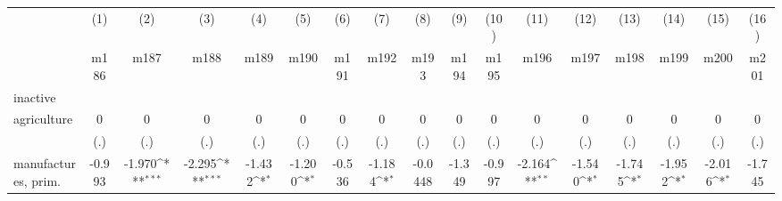 {
\def\sym#1{\ifmmode^{#1}\else\(^{#1}\)\fi}
\begin{tabular}{l*{16}{c}}
\hline\hline
                    &\multicolumn{1}{c}{(1)}&\multicolumn{1}{c}{(2)}&\multicolumn{1}{c}{(3)}&\multicolumn{1}{c}{(4)}&\multicolumn{1}{c}{(5)}&\multicolumn{1}{c}{(6)}&\multicolumn{1}{c}{(7)}&\multicolumn{1}{c}{(8)}&\multicolumn{1}{c}{(9)}&\multicolumn{1}{c}{(10)}&\multicolumn{1}{c}{(11)}&\multicolumn{1}{c}{(12)}&\multicolumn{1}{c}{(13)}&\multicolumn{1}{c}{(14)}&\multicolumn{1}{c}{(15)}&\multicolumn{1}{c}{(16)}\\
                    &\multicolumn{1}{c}{m186}&\multicolumn{1}{c}{m187}&\multicolumn{1}{c}{m188}&\multicolumn{1}{c}{m189}&\multicolumn{1}{c}{m190}&\multicolumn{1}{c}{m191}&\multicolumn{1}{c}{m192}&\multicolumn{1}{c}{m193}&\multicolumn{1}{c}{m194}&\multicolumn{1}{c}{m195}&\multicolumn{1}{c}{m196}&\multicolumn{1}{c}{m197}&\multicolumn{1}{c}{m198}&\multicolumn{1}{c}{m199}&\multicolumn{1}{c}{m200}&\multicolumn{1}{c}{m201}\\
\hline
inactive            &                     &                     &                     &                     &                     &                     &                     &                     &                     &                     &                     &                     &                     &                     &                     &                     \\
agriculture         &           0         &           0         &           0         &           0         &           0         &           0         &           0         &           0         &           0         &           0         &           0         &           0         &           0         &           0         &           0         &           0         \\
                    &         (.)         &         (.)         &         (.)         &         (.)         &         (.)         &         (.)         &         (.)         &         (.)         &         (.)         &         (.)         &         (.)         &         (.)         &         (.)         &         (.)         &         (.)         &         (.)         \\
[1em]
manufactures, prim. &      -0.993         &      -1.970\sym{***}&      -2.295\sym{***}&      -1.432\sym{*}  &      -1.200\sym{*}  &      -0.536         &      -1.184\sym{*}  &     -0.0448         &      -1.349         &      -0.997         &      -2.164\sym{**} &      -1.540\sym{*}  &      -1.745\sym{*}  &      -1.952\sym{*}  &      -2.016\sym{*}  &      -1.745         \\

\end{tabular}}
